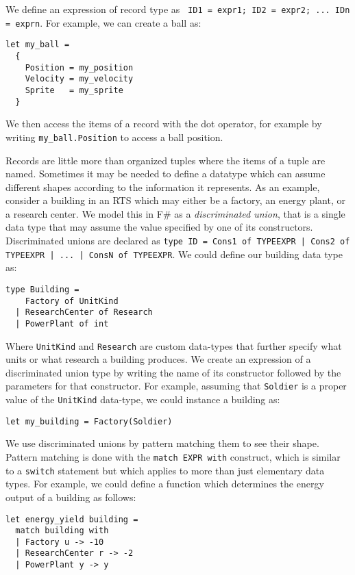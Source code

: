 We define an expression of record type as \texttt{{ ID1 = expr1; ID2 = expr2; ... IDn = exprn}}. For example, we can create a ball as:

\begin{lstlisting}
let my_ball = 
  {
    Position = my_position
    Velocity = my_velocity
    Sprite   = my_sprite
  }
\end{lstlisting}

We then access the items of a record with the dot operator, for example by writing \texttt{my\_ball.Position} to access a ball position.

Records are little more than organized tuples where the items of a tuple are named. Sometimes it may be needed to define a datatype which can assume different shapes according to the information it represents. As an example, consider a building in an RTS which may either be a factory, an energy plant, or a research center. We model this in F\# as a \textit{discriminated union}, that is a single data type that may assume the value specified by one of its constructors. Discriminated unions are declared as \texttt{type ID = Cons1 of TYPEEXPR | Cons2 of TYPEEXPR | ... | ConsN of TYPEEXPR}. We could define our building data type as:

\begin{lstlisting}
type Building = 
    Factory of UnitKind
  | ResearchCenter of Research
  | PowerPlant of int
\end{lstlisting}

Where \texttt{UnitKind} and \texttt{Research} are custom data-types that further specify what units or what research a building produces. We create an expression of a discriminated union type by writing the name of its constructor followed by the parameters for that constructor. For example, assuming that \texttt{Soldier} is a proper value of the \texttt{UnitKind} data-type, we could instance a building as:

\begin{lstlisting}
let my_building = Factory(Soldier)
\end{lstlisting}

We use discriminated unions by pattern matching them to see their shape. Pattern matching is done with the \texttt{match EXPR with} construct, which is similar to a \texttt{switch} statement but which applies to more than just elementary data types. For example, we could define a function which determines the energy output of a building as follows:

\begin{lstlisting}
let energy_yield building = 
  match building with
  | Factory u -> -10
  | ResearchCenter r -> -2
  | PowerPlant y -> y
\end{lstlisting}


